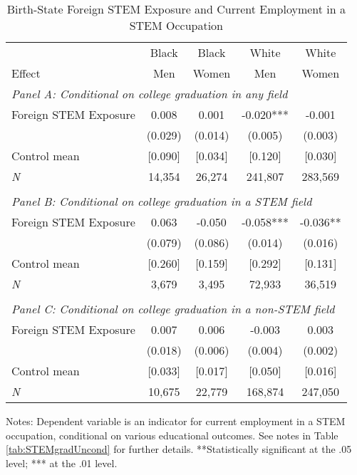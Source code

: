 \begin{table}[ht]
\caption{Birth-State Foreign STEM Exposure and Current Employment in a STEM Occupation}
\label{tab:STEMoccEmpAll}
\centering
\begin{threeparttable}
\begin{tabular}{lcccc}
\toprule 
       & Black           & Black        & White        & White       \\
Effect & Men             & Women        & Men          & Women       \\
\midrule 
\multicolumn{5}{l}{\emph{Panel A: Conditional on college graduation in any field}}\\ 
Foreign STEM Exposure & 0.008  & 0.001  & -0.020*** & -0.001  \\ 
 &  (0.029) & (0.014) & (0.005) & (0.003) \\ 
Control mean &  [0.090] & [0.034] & [0.120] & [0.030] \\ 
\emph{N} &     14,354 &    26,274 &   241,807 &   283,569 \\ 
&&&&\\
\multicolumn{5}{l}{\emph{Panel B: Conditional on college graduation in a STEM field}}\\ 
Foreign STEM Exposure & 0.063  & -0.050  & -0.058*** & -0.036** \\ 
 &  (0.079) & (0.086) & (0.014) & (0.016) \\ 
Control mean &  [0.260] & [0.159] & [0.292] & [0.131] \\ 
\emph{N} &      3,679 &     3,495 &    72,933 &    36,519 \\ 
&&&&\\
\multicolumn{5}{l}{\emph{Panel C: Conditional on college graduation in a non-STEM field}}\\ 
Foreign STEM Exposure & 0.007  & 0.006  & -0.003  & 0.003  \\ 
 &  (0.018) & (0.006) & (0.004) & (0.002) \\ 
Control mean &  [0.033] & [0.017] & [0.050] & [0.016] \\ 
\emph{N} &     10,675 &    22,779 &   168,874 &   247,050 \\ 
\bottomrule 
\end{tabular} 
\footnotesize Notes: Dependent variable is an indicator for current employment in a STEM occupation, conditional on various educational outcomes.  See notes in Table \ref{tab:STEMgradUncond} for further details. **Statistically significant at the .05 level; *** at the .01 level.
\end{threeparttable} 
\end{table} 
